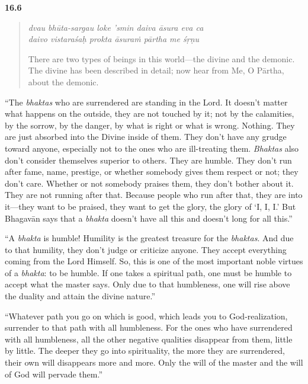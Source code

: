 \par\noindent\textbf{16.6}\par
\begin{verse}
\textit{dvau bhūta-sargau loke ’smin daiva āsura eva ca} \\
\textit{daivo vistaraśaḥ prokta āsuraṁ pārtha me śṛṇu}

\noindent There are two types of beings in this world---the divine and the demonic. The divine has been described in detail; now hear from Me, O Pārtha, about the demonic.
\end{verse}
\par


\enquote{The \textit{bhaktas} who are surrendered are standing in the Lord. It doesn’t matter what happens on the outside, they are not touched by it; not by the calamities, by the sorrow, by the danger, by what is right or what is wrong. Nothing. They are just absorbed into the Divine inside of them. They don’t have any grudge toward anyone, especially not to the ones who are ill-treating them. \textit{Bhaktas} also don’t consider themselves superior to others. They are humble. They don’t run after fame, name, prestige, or whether somebody gives them respect or not; they don’t care. Whether or not somebody praises them, they don’t bother about it. They are not running after that. Because people who run after that, they are into it---they want to be praised, they want to get the glory, the glory of \enquote{I, I, I.} But Bhagavān says that a \textit{bhakta} doesn’t have all this and doesn’t long for all this.}

\enquote{A \textit{bhakta} is humble! Humility is the greatest treasure for the \textit{bhaktas}. And due to that humility, they don’t judge or criticize anyone. They accept everything coming from the Lord Himself. So, this is one of the most important noble virtues of a \textit{bhakta}: to be humble. If one takes a spiritual path, one must be humble to accept what the master says. Only due to that humbleness, one will rise above the duality and attain the divine nature.}

\enquote{Whatever path you go on which is good, which leads you to God-realization, surrender to that path with all humbleness. For the ones who have surrendered with all humbleness, all the other negative qualities disappear from them, little by little. The deeper they go into spirituality, the more they are surrendered, their own will disappears more and more. Only the will of the master and the will of God will pervade them.}

